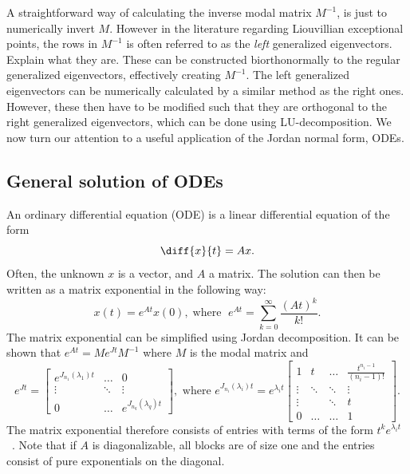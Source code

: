 \documentclass[../main.tex]{subfiles}
\begin{document}
A straightforward way of calculating the inverse modal matrix $M^{-1}$, is just to numerically invert $M$. However in the literature regarding Liouvillian exceptional points, the rows in $M^{-1}$ is often referred to as the \textit{left} generalized eigenvectors. Explain what they are. These can be constructed biorthonormally to the regular generalized eigenvectors, effectively creating $M^{-1}$. The left generalized eigenvectors can be numerically calculated by a similar method as the right ones. However, these then have to be modified such that they are orthogonal to the right generalized eigenvectors, which can be done using LU-decomposition. We now turn our attention to a useful application of the Jordan normal form, ODEs.

\subsection{General solution of ODEs}
An ordinary differential equation (ODE) is a linear differential equation of the form
\begin{equation}\label{eq:ode}
    \diff{x}{t}=Ax. 
\end{equation}
Often, the unknown $x$ is a vector, and $A$ a matrix. The solution can then be written as a matrix exponential in the following way:
\begin{equation}
    x(t) = e^{At}x(0), \;\text{where } \;e^{At} = \sum_{k=0}^{\infty}\frac{(At)^k}{k!}.
\end{equation}
The matrix exponential can be simplified using Jordan decomposition. It can be shown that  $e^{At} = Me^{Jt}M^{-1}$ where $M$ is the modal matrix and
\begin{equation}\label{eq:expjordan}
        e^{Jt} = \begin{bmatrix}e^{J_{n_1}(\lambda_1)t} & \dots & 0 \\
                                                         \vdots & \ddots & \vdots \\
                                                         0 & \dots &  e^{J_{n_q}(\lambda_q)t}\end{bmatrix}, \text{ where } 
            e^{J_{n_i}(\lambda_i)t} = e^{\lambda_it} \begin{bmatrix} 1 & t & \dots & \frac{t^{n_i-1}}{(n_i-1)!}\\
                                                                \vdots  & \ddots & \ddots & \vdots \\
                                                                \vdots & & \ddots& t \\
                                                            0 & \dots & \dots & 1\ \end{bmatrix}.
\end{equation}
The matrix exponential therefore consists of entries with terms of the form $t^ke^{\lambda_it}$~\cite{uffe}. Note that if $A$ is diagonalizable, all blocks are of size one and the entries consist of pure exponentials on the diagonal. 
\end{document}
